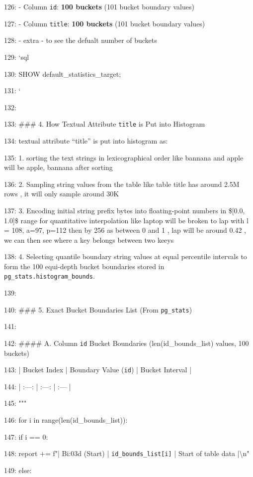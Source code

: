 \documentclass[11pt,a4paper]{article}
\begin{document}
{126: - Column \texttt{id}: \textbf{100 buckets} (101 bucket boundary values)

127: - Column \texttt{title}: \textbf{100 buckets} (101 bucket boundary values)

128: - extra -  to see the defualt number of buckets

129: \texttt{}`sql

130: SHOW default\_statistics\_target;

131: \texttt{}`

132:

133: \#\#\# 4. How Textual Attribute \texttt{title} is Put into Histogram

134: textual attribute “title” is put into histogram as:

135: 1. sorting the text strings in lexicographical order like bannana and apple will be apple, bannana after sorting

136: 2. Sampling string values from the table like table title has around 2.5M rows , it will only sample around 30K

137: 3. Encoding initial string prefix bytes into floating-point numbers in \$[0.0, 1.0]\$ range for quantitative interpolation like laptop will be broken to lap with l = 108, a=97, p=112 then by 256 as between 0 and 1 , lap will be around 0.42 , we can then see where a key belongs between two keeys

138: 4. Selecting quantile boundary string values at equal percentile intervals to form the 100 equi-depth bucket boundaries stored in \texttt{pg\_stats.histogram\_bounds}.

139:

140: \#\#\# 5. Exact Bucket Boundaries List (From \texttt{pg\_stats})

141:

142: \#\#\#\# A. Column \texttt{id} Bucket Boundaries ({len(id\_bounds\_list)} values, 100 buckets)

143: | Bucket Index | Boundary Value (\texttt{id}) | Bucket Interval |

144: | :---: | :---: | :--- |

145: """

146:     for i in range(len(id\_bounds\_list)):

147:         if i == 0:

148:             report += f"| B{i:03d} (Start) | \texttt{{id\_bounds\_list[i]}} | Start of table data |\textbackslash{}n"

149:         else:

}
\end{document}
